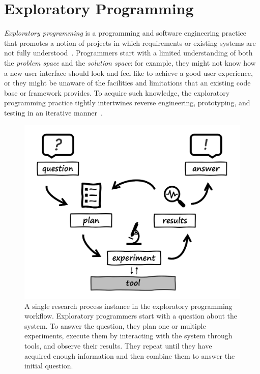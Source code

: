 
\section{Exploratory Programming}
\label{sec:background/exp}

\emph{Exploratory programming} is a programming and software engineering practice that promotes a notion of projects in which requirements or existing systems are not fully understood~\cite{sandberg1988smalltalk,kery2017exploring,rein2018exploratory}.
Programmers start with a limited understanding of both the \emph{problem space} and the \emph{solution space}:
for example, they might not know how a new user interface should look and feel like to achieve a good user experience, or they might be unaware of the facilities and limitations that an existing code base or framework provides.
To acquire such knowledge, the exploratory programming practice tightly intertwines reverse engineering, prototyping, and testing in an iterative manner~\cite{taeumel2022pattern}.

\begin{figure}
	\centering
	\includegraphics[width=.7\textwidth]{01_exp/simple_process.png}
	\caption[A single \emph{research process} in the \emph{exploratory programming workflow}.]{
		A single research process instance in the exploratory programming workflow.
		Exploratory programmers start with a question about the system.
		To answer the question, they plan one or multiple experiments, execute them by interacting with the system through tools, and observe their results.
		They repeat until they have acquired enough information and then combine them to answer the initial question.
	}
	\label{fig:background/exp/simple_process}
\end{figure}

